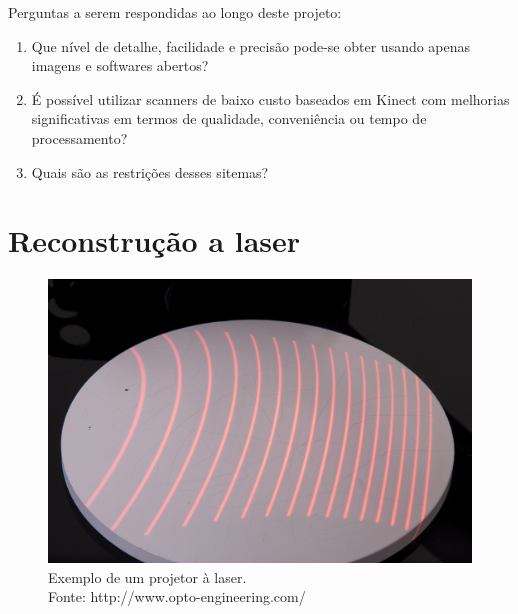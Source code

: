 \documentclass[table, usenames, svgnames, xcolor=dvipsnames]{beamer}
\begin{document}
\begin{frame}

Perguntas a serem respondidas ao longo deste projeto:

	\begin{enumerate}
	\item {Que nível de detalhe, facilidade e precisão pode-se obter usando apenas imagens e softwares abertos?}
	\item {É possível utilizar scanners de baixo custo baseados em Kinect com melhorias significativas em termos de qualidade, conveniência ou tempo de processamento?}
	\item {Quais são as restrições desses sitemas?}
	\end{enumerate}
	
\end{frame}

\section{Reconstrução a laser}


\begin{frame}
	\begin{figure}
		\begin{center}
		\centering
		\includegraphics[width=0.7\linewidth]{figs/luzestruturada.jpg}
		\caption{Exemplo de um projetor à laser. \\
		\tiny{Fonte: http://www.opto-engineering.com/}
		}
	\end{center}
\end{figure}	 

\end{frame}

\end{document}
